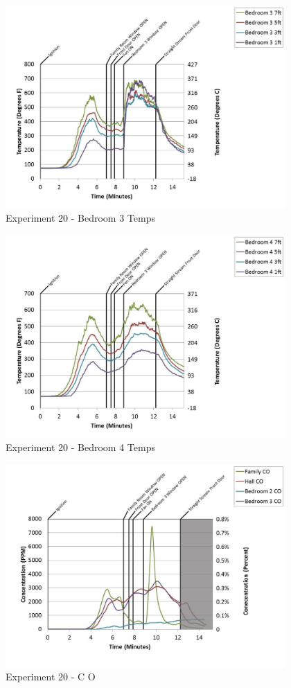\documentclass{article}
\begin{document}
\begin{appendices}
	\begin{figure}[h!]
		\centering
		\includegraphics[height=3.05in]{0_Images/Results_Charts/Exp_20_Charts/Bedroom3Temps.pdf}
		\caption{Experiment 20 - Bedroom 3 Temps}
	\end{figure}
 
	\clearpage

	\begin{figure}[h!]
		\centering
		\includegraphics[height=3.05in]{0_Images/Results_Charts/Exp_20_Charts/Bedroom4Temps.pdf}
		\caption{Experiment 20 - Bedroom 4 Temps}
	\end{figure}
 

	\begin{figure}[h!]
		\centering
		\includegraphics[height=3.05in]{0_Images/Results_Charts/Exp_20_Charts/CO.pdf}
		\caption{Experiment 20 - C O}
	\end{figure}
 

\end{appendices}
\end{document}
